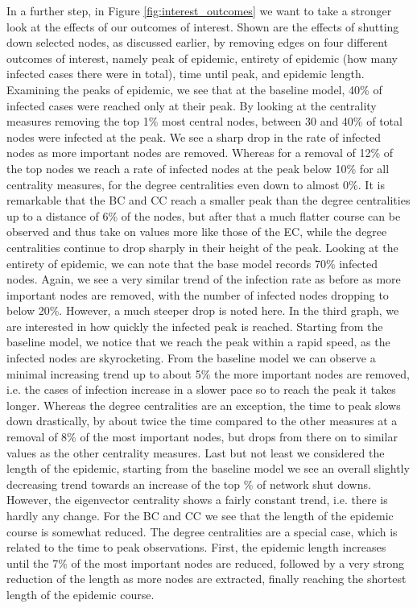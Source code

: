 \documentclass{Template resources/netsci-project}
\begin{document}
In a further step, in Figure \ref{fig:interest_outcomes} we want to take a stronger look at the effects of our outcomes of interest. Shown are the effects of shutting down selected nodes, as discussed earlier, by removing edges on four different outcomes of interest, namely peak of epidemic, entirety of epidemic (how many infected cases there were in total), time until peak, and epidemic length.
Examining the peaks of epidemic, we see that at the baseline model, 40\%  of infected cases were reached only at their peak. By looking at the centrality measures removing the top 1\% most central nodes, between 30 and 40\%  of total nodes were infected at the peak. We see a sharp drop in the rate of infected nodes as more important nodes are removed. Whereas for a removal of 12\%  of the top nodes we reach a rate of infected nodes at the peak below 10\%  for all centrality measures, for the degree centralities even down to almost 0\%. It is remarkable that the BC and CC reach a smaller peak than the degree centralities up to a distance of 6\%  of the nodes, but after that a much flatter course can be observed and thus take on values more like those of the EC, while the degree centralities continue to drop sharply in their height of the peak.
Looking at the entirety of epidemic, we can note that the base model records 70\% infected nodes. Again, we see a very similar trend of the infection rate as before as more important nodes are removed, with the number of infected nodes dropping to below 20\%.  However, a much steeper drop is noted here.
In the third graph, we are interested in how quickly the infected peak is reached. Starting from the baseline model, we notice that we reach the peak within a rapid speed, as the infected nodes are skyrocketing. From the baseline model we can observe a minimal increasing trend up to about 5\% the more important nodes are removed, i.e. the cases of infection increase in a slower pace so to reach the peak it takes longer. Whereas the degree centralities are an exception, the time to peak slows down drastically, by about twice the time compared to the other measures at a removal of 8\% of the most important nodes, but drops from there on to similar values as the other centrality measures.
Last but not least we considered the length of the epidemic, starting from the baseline model we see an overall slightly decreasing trend towards an increase of the top \% of network shut downs. However, the eigenvector centrality shows a fairly constant trend, i.e. there is hardly any change. For the BC and CC we see that the length of the epidemic course is somewhat reduced. The degree centralities are a special case, which is related to the time to peak observations. First, the epidemic length increases until the 7\% of the most important nodes are reduced, followed by a very strong reduction of the length as more nodes are extracted, finally reaching the shortest length of the epidemic course.
\end{document}
